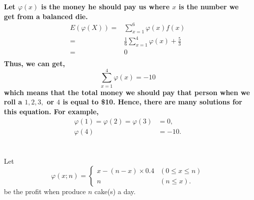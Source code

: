\documentclass{article}
\begin{document}
    \section{}
        \paragraph{
            Let $\varphi(x)$ is the money he should pay us where $x$ is the number we get from a balanced die.
            \begin{equation*}
                \begin{split}
                    E(\varphi(X))=&\sum _{x=1} ^6 \varphi(x)f(x)\\
                        =&\frac{1}{6}\sum_{x=1} ^4 \varphi(x)+\frac{5}{3}\\
                        =&0\\
                \end{split}
            \end{equation*}
            Thus, we can get,
            $$\sum _{x=1} ^4 \varphi(x)=-10$$
            which means that the total money we should pay that person when we roll a $1,2,3,$ or $4$ is equal to \$10. Hence, there are many solutions for this equation. For example,
            \begin{equation*}
                \begin{split}
                    \varphi(1)=\varphi(2)=\varphi(3)&=0,\\
                    \varphi(4)&=-10.
                \end{split}
            \end{equation*}
        }
    

    \section{}
        \subsection{}
            Let 
            \begin{equation*}
                \varphi(x;n)=
                \begin{cases}
                    x-(n-x)\times 0.4 & (0\leq x\leq n)\\
                    n& (n\leq x).
                \end{cases}
            \end{equation*}
            be the profit when produce $n$ cake(s) a day.
\end{document}
